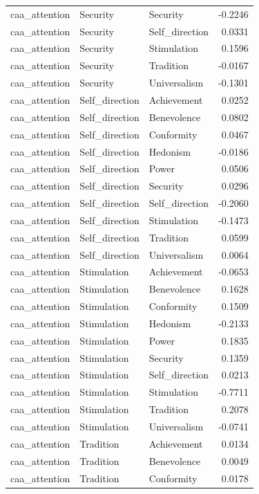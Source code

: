 \begin{tabular}{lllr}
caa\_attention & Security & Security & -0.2246 \\
caa\_attention & Security & Self\_direction & 0.0331 \\
caa\_attention & Security & Stimulation & 0.1596 \\
caa\_attention & Security & Tradition & -0.0167 \\
caa\_attention & Security & Universalism & -0.1301 \\
caa\_attention & Self\_direction & Achievement & 0.0252 \\
caa\_attention & Self\_direction & Benevolence & 0.0802 \\
caa\_attention & Self\_direction & Conformity & 0.0467 \\
caa\_attention & Self\_direction & Hedonism & -0.0186 \\
caa\_attention & Self\_direction & Power & 0.0506 \\
caa\_attention & Self\_direction & Security & 0.0296 \\
caa\_attention & Self\_direction & Self\_direction & -0.2060 \\
caa\_attention & Self\_direction & Stimulation & -0.1473 \\
caa\_attention & Self\_direction & Tradition & 0.0599 \\
caa\_attention & Self\_direction & Universalism & 0.0064 \\
caa\_attention & Stimulation & Achievement & -0.0653 \\
caa\_attention & Stimulation & Benevolence & 0.1628 \\
caa\_attention & Stimulation & Conformity & 0.1509 \\
caa\_attention & Stimulation & Hedonism & -0.2133 \\
caa\_attention & Stimulation & Power & 0.1835 \\
caa\_attention & Stimulation & Security & 0.1359 \\
caa\_attention & Stimulation & Self\_direction & 0.0213 \\
caa\_attention & Stimulation & Stimulation & -0.7711 \\
caa\_attention & Stimulation & Tradition & 0.2078 \\
caa\_attention & Stimulation & Universalism & -0.0741 \\
caa\_attention & Tradition & Achievement & 0.0134 \\
caa\_attention & Tradition & Benevolence & 0.0049 \\
caa\_attention & Tradition & Conformity & 0.0178 \\

\end{tabular}
